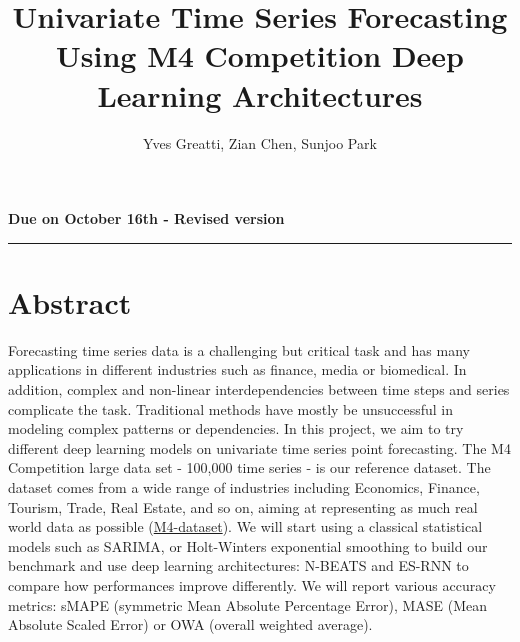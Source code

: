 \documentclass{article}
\title{Univariate Time Series Forecasting Using  M4 Competition Deep Learning Architectures}
\author{Yves Greatti, Zian Chen, Sunjoo Park}
\date{}
\begin{document}
\maketitle
\textbf{Due on October 16th - Revised version}

\noindent\rule{\textwidth}{0.4pt}


\section*{Abstract}
Forecasting time series data is a challenging but critical task and has many applications in different industries such as finance, media or biomedical.
In addition, complex and non-linear interdependencies between time steps and series complicate the task.
Traditional methods have mostly be unsuccessful in modeling complex patterns or dependencies. 
In this project, we aim to try different deep learning models on univariate time series point forecasting.
The M4 Competition large data set - 100,000 time series - is our reference dataset. The dataset comes from a wide range of industries including Economics, Finance, Tourism, Trade, Real Estate, and so on, aiming at representing as much real world data as possible (\hyperlink{https://github.com/M4Competition/M4-methods/tree/master/Dataset} {M4-dataset}).
We will start using a classical statistical models such as SARIMA, or Holt-Winters exponential smoothing to build our benchmark and use deep learning architectures: N-BEATS \cite{N-BEATS} and ES-RNN \cite{ES-RNN} to compare how performances improve differently. We will report various accuracy metrics:
sMAPE (symmetric Mean Absolute Percentage Error), MASE  (Mean Absolute Scaled Error)  or OWA (overall weighted average).
\end{document}
